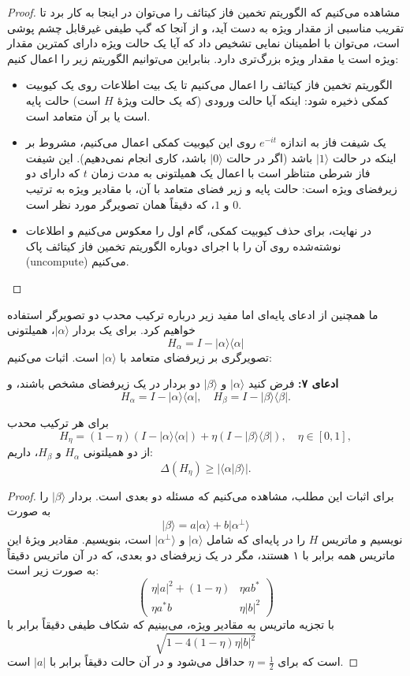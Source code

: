 \begin{proof} 
	مشاهده می‌کنیم که الگوریتم تخمین فاز کیتائف را می‌توان در اینجا به کار برد تا تقریب مناسبی از مقدار ویژه به دست آید، و از آنجا که گپ طیفی غیرقابل ‌چشم پوشی است، می‌توان با اطمینان نمایی تشخیص داد که آیا یک حالت ویژه دارای کمترین مقدار ویژه است یا مقدار ویژه بزرگ‌تری دارد.  بنابراین می‌توانیم الگوریتم زیر را اعمال کنیم:  
	
	\begin{itemize}
		\item
		 الگوریتم تخمین فاز کیتائف را اعمال می‌کنیم تا یک بیت اطلاعات روی یک کیوبیت کمکی ذخیره شود: اینکه آیا حالت ورودی (که یک حالت ویژهٔ $H$ است) حالت پایه است یا بر آن متعامد است.  
		
		\item
		 یک شیفت فاز به اندازه $e^{-it}$ روی این کیوبیت کمکی اعمال می‌کنیم، مشروط بر اینکه در حالت $|1\rangle$ باشد (اگر در حالت $|0\rangle$ باشد، کاری انجام نمی‌دهیم). این شیفت فاز شرطی متناظر است با اعمال یک همیلتونی به مدت زمان $t$ که دارای دو زیرفضای ویژه است: حالت پایه و زیر فضای متعامد با آن، با مقادیر ویژه به ترتیب $0$ و $1$، که دقیقاً همان تصویرگر مورد نظر است.  
		
		\item
		 در نهایت، برای حذف کیوبیت کمکی، گام اول را معکوس می‌کنیم و اطلاعات نوشته‌شده روی آن را با اجرای دوباره الگوریتم تخمین فاز کیتائف پاک (uncompute) می‌کنیم.  
	\end{itemize}
\end{proof}
ما همچنین از ادعای پایه‌ای اما مفید زیر درباره ترکیب محدب دو تصویرگر استفاده خواهیم کرد.  برای یک بردار $|\alpha\rangle$، همیلتونی  
\[
H_\alpha = I - |\alpha\rangle\langle\alpha|
\]  
تصویرگری بر زیرفضای متعامد با $|\alpha\rangle$ است. اثبات می‌کنیم:  

\textbf{ادعای ۷:}  
فرض کنید $|\alpha\rangle$ و $|\beta\rangle$ دو بردار در یک زیرفضای مشخص باشند، و  
\[
H_\alpha = I - |\alpha\rangle\langle\alpha|, \quad H_\beta = I - |\beta\rangle\langle\beta|.
\]  

برای هر ترکیب محدب  
\[
H_\eta = (1-\eta)(I - |\alpha\rangle\langle\alpha|) + \eta (I - |\beta\rangle\langle\beta|), \quad \eta \in [0,1],
\]  
از دو همیلتونی $H_\alpha$ و $H_\beta$، داریم:  
\[
\Delta(H_\eta) \ge |\langle \alpha|\beta\rangle|.
\]  
\begin{proof}
برای اثبات این مطلب، مشاهده می‌کنیم که مسئله دو بعدی است. بردار $|\beta\rangle$ را به صورت  
\[
|\beta\rangle = a|\alpha\rangle + b|\alpha^\perp\rangle
\]  
نویسیم و ماتریس $H$ را در پایه‌ای که شامل $|\alpha\rangle$ و $|\alpha^\perp\rangle$ است، بنویسیم. مقادیر ویژهٔ این ماتریس همه برابر با ۱ هستند، مگر در یک زیرفضای دو بعدی، که در آن ماتریس دقیقاً به صورت زیر است:  
\begin{equation}
	\left( {\begin{array}{*{20}{c}}
		{\eta |a{|^2} + (1 - \eta )}&{\eta ab^*} \\ 
		{\eta a^*b}&{\eta |b{|^2}} 
\end{array}} \right)
\end{equation}
با تجزیه ماتریس به مقادیر ویژه، می‌بینیم که شکاف طیفی دقیقاً برابر با  
\[
\sqrt{1 - 4(1 - \eta)\eta |b|^2}
\]  
است که برای $\eta = \frac{1}{2}$ حداقل می‌شود و در آن حالت دقیقاً برابر با $|a|$ است.
\end{proof}
